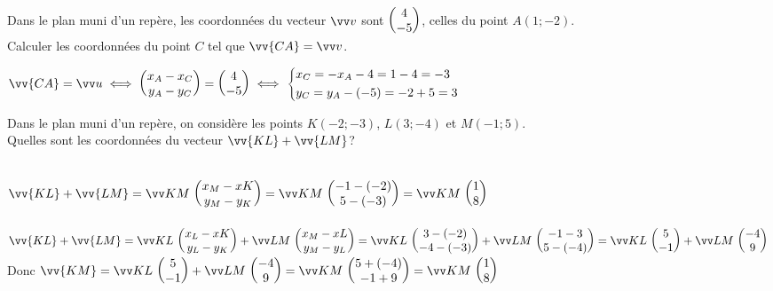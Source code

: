 \documentclass[11pt,a4paper]{article}  %
\begin{document}
\begin{exercice}{}
	Dans le plan muni d'un repère, les coordonnées du vecteur $\vv v$ sont $\begin{pmatrix} 4\\ -5 \end{pmatrix}$, celles du point $A(1;-2)$.\\ Calculer les coordonnées du point $C$ tel que $\vv{CA}=\vv v$.
	\begin{corrBox}
		$\vv{CA}=\vv u \iff \CoordSV{x_A-x_C}{y_A-y_C}=\CoordSV{4}{-5} \iff \begin{cases*}
			x_C=-x_A-4=1-4=-3\\
			y_C=y_A-(-5)=-2+5=3
		\end{cases*}$
	\end{corrBox}
\end{exercice}

\begin{exercice}{}
	Dans le plan muni d'un repère, on considère les points $K(-2;-3)$, $L(3;-4)$ et $M(-1;5)$. \\ Quelles sont les coordonnées du vecteur $\vv{KL}+\vv{LM}$?\\
	\begin{corrBox}
		\\
		$\vv{KL}+\vv{LM}=\Coord{KM}{x_M-xK}{y_M-y_K}=\Coord{KM}{-1-(-2)}{5-(-3)}=\Coord{KM}{1}{8}$\\
		\\
		$\vv{KL}+\vv{LM}=\Coord{KL}{x_L-xK}{y_L-y_K}+\Coord{LM}{x_M-xL}{y_M-y_L}=\Coord{KL}{3-(-2)}{-4-(-3)}+\Coord{LM}{-1-3}{5-(-4)}=\Coord{KL}{5}{-1}+\Coord{LM}{-4}{9}$\\
		Donc $\vv{KM}=\Coord{KL}{5}{-1}+\Coord{LM}{-4}{9}=\Coord{KM}{5+(-4)}{-1+9}=\Coord{KM}{1}{8}$
	\end{corrBox}
	
\end{exercice}
\end{document}
